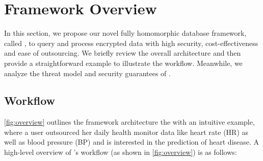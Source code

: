 \section{Framework Overview} \label{overview}
In this section, we propose our novel fully homomorphic database framework, 
called \NAME,
to query and process encrypted data with high security, cost-effectiveness
and ease of outsourcing. We briefly review the overall architecture
and then provide a straightforward example to illustrate the \NAME workflow.
Meanwhile, we analyze the threat model and security guarantees of \NAME.

\subsection{\NAME Workflow} \label{overview:workflow}
\cref{fig:overview} outlines the framework architecture the \NAME 
with an intuitive example, where a user outsourced her daily health 
monitor data like heart rate (HR) as well as blood pressure (BP) 
and is interested in the prediction of heart disease. 
A high-level overview of
\NAME’s workflow (as shown in \cref{fig:overview}) is as follows:

